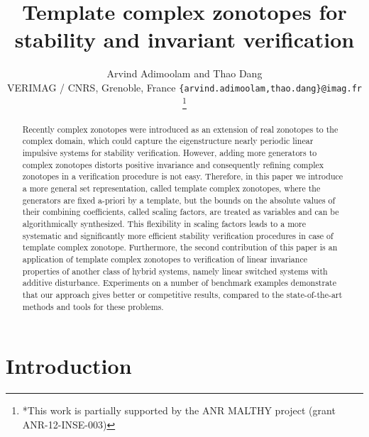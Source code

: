 \documentclass[letterpaper, 10 pt, conference]{ieeeconf}  %
\title{Template complex zonotopes for stability and invariant
  verification}
\author{Arvind Adimoolam and Thao Dang\\%
\vspace{1em}
\small{VERIMAG / CNRS, Grenoble, France} {\tt\small \{arvind.adimoolam,thao.dang\}@imag.fr}
\thanks{*This work is partially supported by the ANR MALTHY project (grant ANR-12-INSE-003)}%
}
\numberwithin{thm}{section}
\begin{document}
\maketitle


\begin{abstract}
Recently complex zonotopes were introduced as an extension of real
zonotopes to the complex domain, which could capture the eigenstructure
nearly periodic linear impulsive systems for stability
verification. %
However, adding more generators to complex zonotopes distorts positive
invariance and consequently refining complex zonotopes in a verification
procedure is not easy. Therefore, in this paper we introduce a more
general set representation, called template complex zonotopes, where
the generators are fixed a-priori by a template, but the bounds on the
absolute values of their combining coefficients, called scaling
factors, are treated as variables and can be algorithmically
synthesized. %
This flexibility in scaling factors leads to a more systematic and
significantly more efficient stability verification procedures in case
of template complex zonotope. Furthermore, the second contribution of
this paper is an application of template complex zonotopes to
verification of linear invariance properties of another class of
hybrid systems, namely linear switched systems with additive
disturbance. Experiments on a number of benchmark examples demonstrate
that our approach gives better or competitive results, compared to the
state-of-the-art methods and tools for these problems.
\end{abstract}

\section{Introduction}


 

  



%
%
\end{document}
